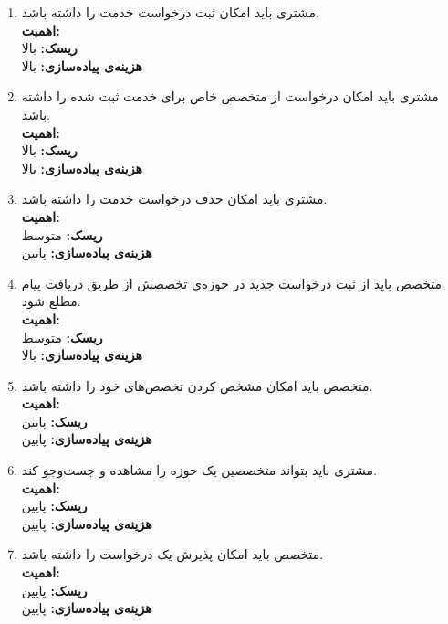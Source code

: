\begin{enumerate}
	\item
مشتری باید امکان ثبت درخواست خدمت را داشته باشد.
	\\
	\textbf{اهمیت:} 
	\\
	\textbf{ریسک:} بالا
	\\
	\textbf{هزینه‌ی پیاده‌سازی:} بالا
	
	
	\item
	مشتری باید امکان درخواست از متخصص خاص برای خدمت ثبت شده را داشته باشد.
	\\
	\textbf{اهمیت:} 
	\\
	\textbf{ریسک:} بالا
	\\
	\textbf{هزینه‌ی پیاده‌سازی:} بالا
	
	\item
	مشتری باید امکان حذف درخواست خدمت را داشته باشد.
	\\
	\textbf{اهمیت:} 
	\\
	\textbf{ریسک:} متوسط
	\\
	\textbf{هزینه‌ی پیاده‌سازی:} پایین
	
	\item
	متخصص باید از ثبت درخواست جدید در حوزه‌ی تخصصش از طریق دریافت پیام مطلع شود.
	\\
	\textbf{اهمیت:} 
	\\
	\textbf{ریسک:} متوسط
	\\
	\textbf{هزینه‌ی پیاده‌سازی:} بالا
	
		\item
متخصص باید امکان مشخص کردن تخصص‌های خود را داشته باشد.
	\\
	\textbf{اهمیت:} 
	\\
	\textbf{ریسک:} پایین
	\\
	\textbf{هزینه‌ی پیاده‌سازی:} پایین
	
			\item
	مشتری باید بتواند متخصصین یک حوزه را مشاهده و جست‌و‌جو کند.
	\\
	\textbf{اهمیت:} 
	\\
	\textbf{ریسک:} پایین
	\\
	\textbf{هزینه‌ی پیاده‌سازی:} پایین
	
	
	\item
	متخصص باید امکان پذیرش یک درخواست را داشته باشد.
	\\
	\textbf{اهمیت:} 
	\\
	\textbf{ریسک:} پایین
	\\
	\textbf{هزینه‌ی پیاده‌سازی:} پایین
	

\end{enumerate}
